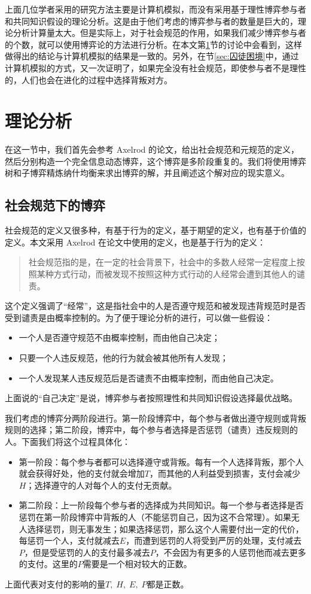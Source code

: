\documentclass[lang=cn,11pt]{elegantpaper}
\begin{document}
上面几位学者采用的研究方法主要是计算机模拟，而没有采用基于理性博弈参与者和共同知识假设的理论分析。这是由于他们考虑的博弈参与者的数量是巨大的，理论分析计算量太大。但是实际上，对于社会规范的作用，如果我们减少博弈参与者的个数，就可以使用博弈论的方法进行分析。在本文第\ref{sec:理论分析}节的讨论中会看到，这样做得出的结论与计算机模拟的结果是一致的。另外，在节\ref{sec:囚徒困境}中，通过计算机模拟的方式，又一次证明了，如果完全没有社会规范，即使参与者不是理性的，人们也会在进化的过程中选择背叛对方。


\section{理论分析}\label{sec:理论分析}
在这一节中，我们首先会参考 Axelrod 的论文\cite{Axelrod1986}，给出社会规范和元规范的定义，然后分别构造一个完全信息动态博弈，这个博弈是多阶段重复的。我们将使用博弈树和子博弈精炼纳什均衡来求出博弈的解，并且阐述这个解对应的现实意义。

\subsection{社会规范下的博弈}
社会规范的定义又很多种，有基于行为的定义，基于期望的定义，也有基于价值的定义。本文采用 Axelrod 在论文\cite{Axelrod1986}中使用的定义，也是基于行为的定义：
\begin{quotation}
	社会规范指的是，在一定的社会背景下，社会中的多数人经常一定程度上按照某种方式行动，而被发现不按照这种方式行动的人经常会遭到其他人的谴责。
\end{quotation}
这个定义强调了“经常”，这是指社会中的人是否遵守规范和被发现违背规范时是否受到谴责是由概率控制的。为了便于理论分析的进行，可以做一些假设：
\begin{itemize}
	\setlength{\itemsep}{0.7ex}
	\item 一个人是否遵守规范不由概率控制，而由他自己决定；
	\item 只要一个人违反规范，他的行为就会被其他所有人发现；
	\item 一个人发现某人违反规范后是否谴责不由概率控制，而由他自己决定。
\end{itemize}
上面说的“自己决定”是说，博弈参与者按照理性和共同知识假设选择最优战略。

我们考虑的博弈分两阶段进行。第一阶段博弈中，每个参与者做出遵守规则或背叛规则的选择；第二阶段，博弈中，每个参与者选择是否惩罚（谴责）违反规则的人。下面我们将这个过程具体化：
\begin{itemize}
	\item 第一阶段：每个参与者都可以选择遵守或背叛。每有一个人选择背叛，那个人就会获得好处，他的支付就会增加$T$，而其他的人利益受到损害，支付会减少$H$；选择遵守的人对每个人的支付无贡献。
	\item 第二阶段：上一阶段每个参与者的选择成为共同知识。每一个参与者选择是否惩罚在第一阶段博弈中背叛的人（不能惩罚自己，因为这不合常理）。如果无人选择惩罚，则无事发生；如果选择惩罚，那么这个人需要付出一定的代价，每惩罚一个人，支付就减去$E$，而遭到惩罚的人将受到严厉的处理，支付减去$P$，但是受惩罚的人的支付最多减去$P$，不会因为有更多的人惩罚他而减去更多的支付。这里的$P$需要是一个相对较大的正数。
\end{itemize}
上面代表对支付的影响的量$T,\;H,\;E,\;P$都是正数。
\end{document}
